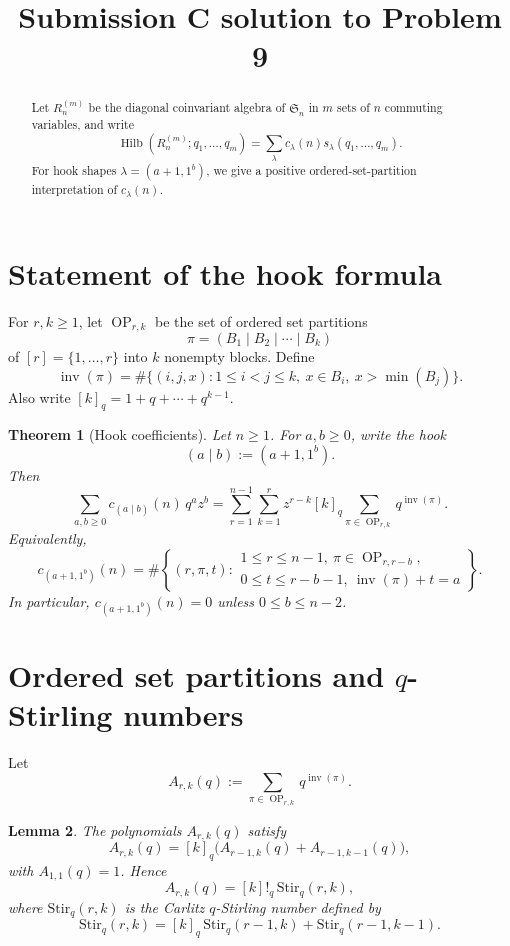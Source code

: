 \documentclass[11pt]{article}
\newtheorem{theorem}{Theorem}
\newtheorem{lemma}[theorem]{Lemma}
\DeclareMathOperator{\Hilb}{Hilb}
\DeclareMathOperator{\Inv}{inv}
\DeclareMathOperator{\OP}{OP}
\begin{document}
\title{Submission C solution to Problem 9}
\date{}
\maketitle


\begin{abstract}
Let \(R_n^{(m)}\) be the diagonal coinvariant algebra of \(\mathfrak S_n\) in
\(m\) sets of \(n\) commuting variables, and write
\[
\Hilb(R_n^{(m)};q_1,\dots,q_m)
=
\sum_{\lambda} c_\lambda(n)s_\lambda(q_1,\dots,q_m).
\]
For hook shapes \(\lambda=(a+1,1^b)\), we give a positive ordered-set-partition
interpretation of \(c_\lambda(n)\).
\end{abstract}

\section{Statement of the hook formula}

For \(r,k\geq 1\), let \(\OP_{r,k}\) be the set of ordered set partitions
\[
\pi=(B_1\mid B_2\mid \cdots \mid B_k)
\]
of \([r]=\{1,\dots,r\}\) into \(k\) nonempty blocks. Define
\[
\Inv(\pi)
=
\#\{(i,j,x): 1\leq i<j\leq k,\ x\in B_i,\ x>\min(B_j)\}.
\]
Also write \([k]_q=1+q+\cdots+q^{k-1}\).

\begin{theorem}[Hook coefficients]
Let \(n\geq 1\). For \(a,b\geq 0\), write the hook
\[
(a\mid b):=(a+1,1^b).
\]
Then
\[
\boxed{
\sum_{a,b\geq 0} c_{(a\mid b)}(n)\,q^a z^b
=
\sum_{r=1}^{n-1}\sum_{k=1}^{r}
z^{r-k}[k]_q
\sum_{\pi\in \OP_{r,k}} q^{\Inv(\pi)}.
}
\]
Equivalently,
\[
\boxed{
c_{(a+1,1^b)}(n)
=
\#\left\{
(r,\pi,t):
\begin{array}{l}
1\leq r\leq n-1,\ \pi\in \OP_{r,r-b},\\
0\leq t\leq r-b-1,\ \Inv(\pi)+t=a
\end{array}
\right\}.
}
\]
In particular, \(c_{(a+1,1^b)}(n)=0\) unless \(0\leq b\leq n-2\).
\end{theorem}

\section{Ordered set partitions and \(q\)-Stirling numbers}

Let
\[
A_{r,k}(q):=\sum_{\pi\in \OP_{r,k}} q^{\Inv(\pi)}.
\]

\begin{lemma}
The polynomials \(A_{r,k}(q)\) satisfy
\[
A_{r,k}(q)=[k]_q\bigl(A_{r-1,k}(q)+A_{r-1,k-1}(q)\bigr),
\]
with \(A_{1,1}(q)=1\). Hence
\[
A_{r,k}(q)=[k]!_q\,\mathrm{Stir}_q(r,k),
\]
where \(\mathrm{Stir}_q(r,k)\) is the Carlitz \(q\)-Stirling number defined by
\[
\mathrm{Stir}_q(r,k)=[k]_q\,\mathrm{Stir}_q(r-1,k)+\mathrm{Stir}_q(r-1,k-1).
\]
\end{lemma}
\end{document}
